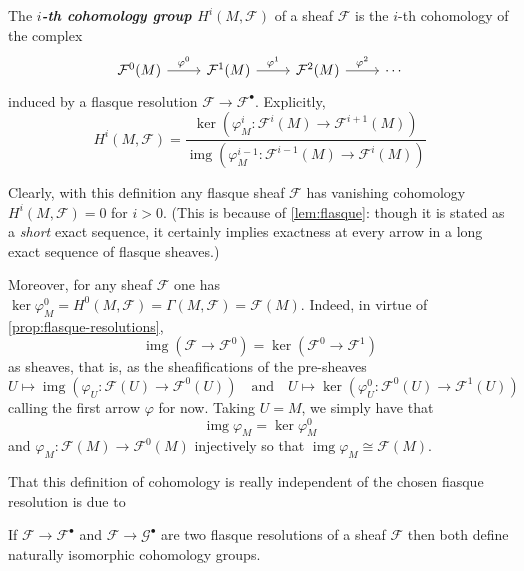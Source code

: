\documentclass{article}
\newcommand{\Fc}{\mathcal{F}}
\newcommand{\Gc}{\mathcal{G}}
\DeclareMathOperator{\img}{img}
\begin{document}
\begin{defn}
	The \textbf{\textit{$i$-th cohomology group $H^i(M,\Fc)$}} of a sheaf $\Fc$ is the $i$-th cohomology of the complex
	\[\begin{tikzcd}
		\Fc^0(M)\arrow[r,"\varphi^0"]&\Fc^1(M)\arrow[r,"\varphi^1"]&\Fc^2(M)\arrow[r,"\varphi^2"]&\cdots
	\end{tikzcd}\]
	{\color{cyan}induced by a flasque resolution} $\Fc\to\Fc^\bullet$. Explicitly,
	\[H^i(M,\Fc)=\dfrac{\ker(\varphi^i_M:\Fc^i(M)\to\Fc^{i+1}(M))}{\img(\varphi^{i-1}_M:\Fc^{i-1}(M)\to\Fc^i(M))}\]
\end{defn}
Clearly, with this definition any flasque sheaf $\Fc$ has vanishing cohomology $H^i(M,\Fc)=0$ for $i>0$. (This is because of \cref{lem:flasque}: though it is stated as a \textit{short} exact sequence, it certainly implies exactness at every arrow in a long exact sequence of flasque sheaves.)

Moreover, for any sheaf $\Fc$ one has $\ker\varphi_M^0=H^0(M,\Fc)=\Gamma(M,\Fc)=\Fc(M)$. Indeed, in virtue of \cref{prop:flasque-resolutions}, \[\img(\Fc\to\Fc^0)=\ker(\Fc^0\to\Fc^1)\]
as sheaves, that is, as the sheafifications of the pre-sheaves
\[U\mapsto\img (\varphi_U:\Fc(U)\to\Fc^0(U))\quad \text{and}\quad U\mapsto\ker(\varphi^0_U:\Fc^0(U)\to\Fc^1(U))\]
calling the first arrow $\varphi$ for now. Taking $U=M$, we simply have that
\[\img\varphi_M=\ker\varphi^0_M\]
and $\varphi_M:\Fc(M)\to\Fc^0(M)$ injectively so that $\img\varphi_M\cong\Fc(M)$.

That this definition of cohomology is really independent of the chosen fiasque resolution is due to
\begin{prop}
	If $\Fc\to\Fc^\bullet$ and $\Fc\to\Gc^\bullet$ are two flasque resolutions of a sheaf $\Fc$ then both define naturally isomorphic cohomology groups.
\end{prop}
\end{document}
